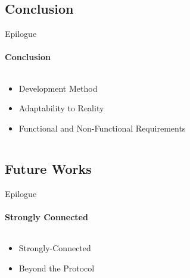     \subsection{Conclusion}
        \begin{frame}[t]{Epilogue}\framesubtitle{Conclusion}
        \begin{columns}[T]
            \begin{column}{0.48\textwidth}
                \begin{itemize}
                    \item Development Method
                    \item Adaptability to Reality
                    \item Functional and Non-Functional Requirements
                \end{itemize}
            \end{column}
            \begin{column}{.48\textwidth}
                \begin{figure}
                \end{figure}
            \end{column}
        \end{columns}
        \end{frame}

    \subsection{Future Works}
        \begin{frame}[t]{Epilogue}\framesubtitle{Strongly Connected}
            \begin{columns}[T]
                \begin{column}{0.48\textwidth}
                    \begin{itemize}
                        \item Strongly-Connected
                        \item Beyond the Protocol
                    \end{itemize}
                \end{column}
            \begin{column}{.48\textwidth}
                \begin{figure}
                \end{figure}
            \end{column}
        \end{columns}
        \end{frame}